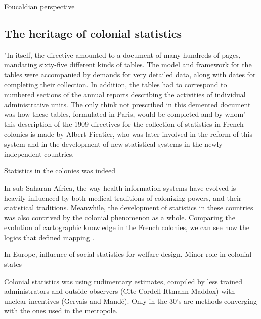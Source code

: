 \documentclass[letterpaper, 10 pt, conference]{ieeeconf}  %
\begin{document}


Foucaldian perspective

\subsection{The heritage of colonial statistics}

"In itself, the directive amounted to a document of many hundreds of pages, mandating sixty-five different kinds of tables. The model and framework for the tables were accompanied by demands for very detailed data, along with dates for completing their collection. In addition, the tables had to correspond to numbered sections of the annual reports describing the activities of individual administrative units. The only think not prescribed in this demented document was how these tables, formulated in Paris, would be completed and by whom" this description of the 1909 directives for the collection of statistics in French colonies is made by Albert Ficatier, who was later involved in the reform of this system and in the development of new statistical systems in the newly independent countries.

Statistics in the colonies was indeed


In sub-Saharan Africa, the way health information systems have evolved is heavily influenced by both medical traditions
of colonizing powers, and their statistical traditions. Meanwhile, the development of statistics in these countries was also contrived by the colonial phenomenon as a whole. Comparing the evolution of cartographic knowledge in the French colonies, we can see how the logics that defined mapping \cite{appadurai_number_1996}.

In Europe, influence of social statistics for welfare design. Minor role in colonial states \cite{cordell_couting_2010}

Colonial statistics was using rudimentary estimates, compiled by less trained administrators and outside observers (Cite Cordell Ittmann  Maddox) with unclear incentives (Gervais and Mandé). Only in the 30's are methods converging with the ones used in the metropole.
\end{document}
